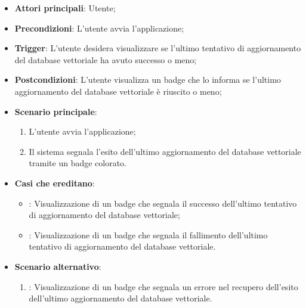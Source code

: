 \begin{itemize}
    \item \textbf{Attori principali}: Utente;
    \item \textbf{Precondizioni}: L'utente avvia l'applicazione;
    \item \textbf{Trigger}: L'utente desidera visualizzare se l'ultimo tentativo di aggiornamento del database vettoriale
    ha avuto successo o meno;
    \item \textbf{Postcondizioni}: L'utente visualizza un badge che lo informa se l'ultimo aggiornamento del database vettoriale
    è riuscito o meno;
    \item \textbf{Scenario principale}:
    \begin{enumerate}
        \item L'utente avvia l'applicazione;
        \item Il sistema segnala l'esito dell'ultimo aggiornamento del database vettoriale tramite un badge colorato.
    \end{enumerate}
    \item \textbf{Casi che ereditano}:
    \begin{itemize}
        \item {}: Visualizzazione di un badge che segnala il successo dell'ultimo tentativo di aggiornamento del database vettoriale;
        \item {}: Visualizzazione di un badge che segnala il fallimento dell'ultimo tentativo di aggiornamento del database vettoriale.
    \end{itemize}
    \item \textbf{Scenario alternativo}:
    \begin{enumerate}
        \item {}: Visualizzazione di un badge che segnala un errore nel recupero dell'esito dell'ultimo aggiornamento del database vettoriale.
    \end{enumerate}
\end{itemize}

\hypertarget{UC16}{}
